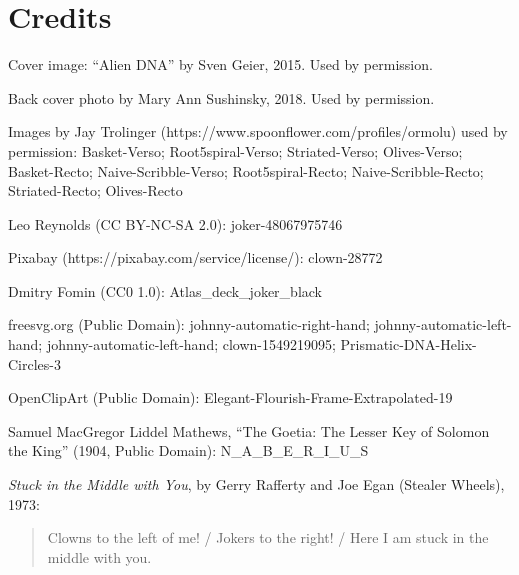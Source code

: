 \hypertarget{credits}{%
\chapter{Credits}\label{credits}}

Cover image: ``Alien DNA'' by Sven Geier, 2015. Used by permission.

Back cover photo by Mary Ann Sushinsky, 2018. Used by permission.

Images by Jay Trolinger (https://www.spoonflower.com/profiles/ormolu)
used by permission: Basket-Verso; Root5spiral-Verso; Striated-Verso;
Olives-Verso; Basket-Recto; Naive-Scribble-Verso; Root5spiral-Recto;
Naive-Scribble-Recto; Striated-Recto; Olives-Recto

Leo Reynolds (CC BY-NC-SA 2.0): joker-48067975746

Pixabay (https://pixabay.com/service/license/): clown-28772

Dmitry Fomin (CC0 1.0): Atlas\_deck\_joker\_black

freesvg.org (Public Domain): johnny-automatic-right-hand;
johnny-automatic-left-hand; johnny-automatic-left-hand;
clown-1549219095; Prismatic-DNA-Helix-Circles-3

OpenClipArt (Public Domain): Elegant-Flourish-Frame-Extrapolated-19

Samuel MacGregor Liddel Mathews, ``The Goetia: The Lesser Key of Solomon
the King'' (1904, Public Domain): N\_A\_B\_E\_R\_I\_U\_S

\emph{Stuck in the Middle with You}, by Gerry Rafferty and Joe Egan
(Stealer Wheels), 1973:

\begin{quote}
Clowns to the left of me! / Jokers to the right! / Here I am stuck in
the middle with you.
\end{quote}

